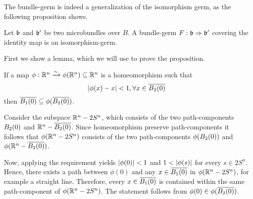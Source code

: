\begin{myparagraph}
    The bundle-germ is indeed a generalization of the isomorphism germ, as the following proposition shows.
\end{myparagraph}

\begin{myproposition}[Williamson]
    Let $\mathfrak{b}$ and $\mathfrak{b}'$ be two microbundles over $B$.
    A bundle-germ $F: \mathfrak{b} \Rightarrow \mathfrak{b}'$ covering the identity map is an isomorphism-germ.
\end{myproposition}

\begin{myparagraph}
    First we show a lemma, which we will use to prove the proposition.
\end{myparagraph}

\begin{mylemma}
    If a map $\phi: \mathbb{R}^n \xrightarrow{\sim} \phi(\mathbb{R}^n) \subseteq{} \mathbb{R}^n$ is a homeomorphism such that 
    \[ \abs{\phi(x) - x} < 1, \forall x \in \clball[2] \]
    then $\clball[1] \sub \phi(\clball[2])$.
\end{mylemma}

\begin{myproof}
    Consider the subspace $\mathbb{R}^n - 2S^n$, which consists of the two path-components $\ball[2]$ and $\R^n - \clball[2]$.
    Since homeomorphism preserve path-components it follows that $\phi(\mathbb{R}^n - 2S^n)$ consists of the two path-components $\phi(\ball[2])$ and $\phi(\R^n - \clball[2])$.

    Now, applying the requirement yields $\vert{} \phi(0) \vert{} < 1$ and $1 < \vert{} \phi(s) \vert{}$ for every $s \in 2S^n$.
    Hence, there exists a path between $\phi(0)$ and any $x \in \clball[1]$ in $\phi(\mathbb{R}^n - 2S^n)$, for example a straight line.
    Therefore, every $x \in \clball[1]$ is contained within the same path-component of $\phi(\mathbb{R}^n - 2S^n)$.
    The statement follows from $\phi(0) \in \phi(\clball[2])$.
\end{myproof}

